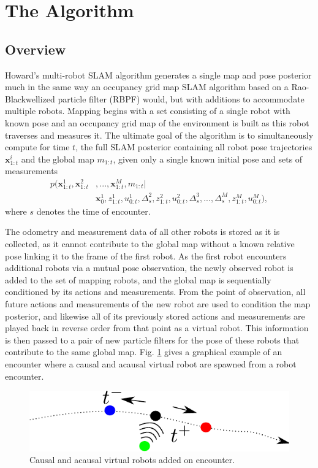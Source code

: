 \section{The Algorithm}
\label{S:Alg}

\subsection{Overview}
\label{SS:Alg:Overview} 


Howard's multi-robot SLAM algorithm generates a single map and pose posterior much in the same way an occupancy grid map SLAM algorithm based on a Rao-Blackwellized particle filter (RBPF) would, but with additions to accommodate multiple robots. Mapping begins with a set consisting of a single robot with known pose and an occupancy grid map of the environment is built as this robot traverses and measures it. The ultimate goal of the algorithm is to simultaneously compute for time $t$, the full SLAM posterior containing all robot pose trajectories $\textbf{x}_{1:t}^i$ and the global map $m_{1:t}$, given only a single known initial pose and sets of measurements
\begin{align*}
p(\textbf{x}_{1:t}^1,\textbf{x}_{1:t}^2&,...,\textbf{x}_{1:t}^M,m_{1:t}|\\&\textbf{x}_0^1,z_{1:t}^1,u_{0:t}^1,\Delta_s^2,z_{1:t}^2,u_{0:t}^2,\Delta_s^3,...,\Delta_s^M,z_{1:t}^M,u_{0:t}^M),
\end{align*}
where $s$ denotes the time of encounter.

The odometry and measurement data of all other robots is stored as it is collected, as it cannot contribute to the global map without a known relative pose linking it to the frame of the first robot. As the first robot encounters additional robots via a mutual pose observation, the newly observed robot is added to the set of mapping robots, and the global map is sequentially conditioned by its actions and measurements. From the point of observation, all future actions and measurements of the new robot are used to condition the map posterior, and likewise all of its previously stored actions and measurements are played back in reverse order from that point as a virtual robot. This information is then passed to a pair of new particle filters for the pose of these robots that contribute to the same global map. Fig. \ref{fig:forwardbackward} gives a graphical example of an encounter where a causal and acausal virtual robot are spawned from a robot encounter.
\begin{figure}[ht]
\centering
\includegraphics[width=\columnwidth]{../FinalFigures/ForwardBackward.pdf}
\caption{Causal and acausal virtual robots added on encounter.}
\label{fig:forwardbackward}
\end{figure}

